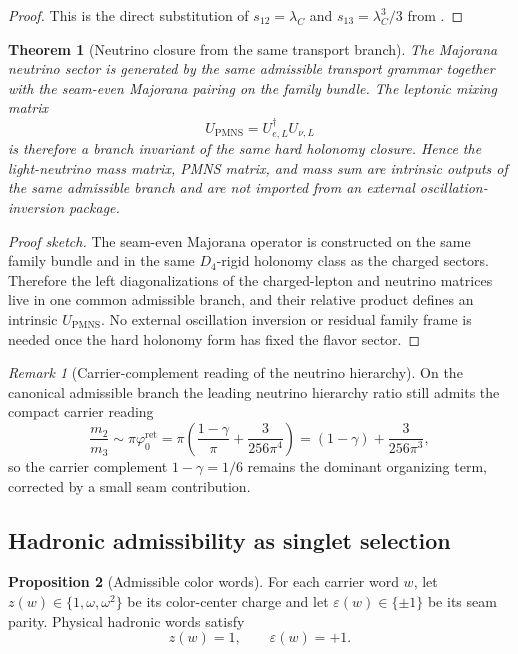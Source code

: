 \documentclass[11pt,a4paper]{article}
\newtheorem{theorem}{Theorem}[section]
\theoremstyle{definition}
\newtheorem{proposition}[theorem]{Proposition}
\theoremstyle{remark}
\newtheorem*{remark}{Remark}
\newcommand{\phiz}{\varphi_0^{\mathrm{ret}}}
\begin{document}
\begin{proof}
This is the direct substitution of $s_{12}=\lambda_C$ and
$s_{13}=\lambda_C^3/3$ from .
\end{proof}

\begin{theorem}[Neutrino closure from the same transport branch]
\label{thm:neutrino-closure}
The Majorana neutrino sector is generated by the same admissible transport grammar together
with the seam-even Majorana pairing on the family bundle. The leptonic mixing matrix
\[
U_{\mathrm{PMNS}}=U_{e,L}^\dagger U_{\nu,L}
\]
is therefore a branch invariant of the same hard holonomy closure. Hence the light-neutrino mass
matrix, PMNS matrix, and mass sum are intrinsic outputs of the same admissible branch and are not
imported from an external oscillation-inversion package.
\end{theorem}

\begin{proof}[Proof sketch]
The seam-even Majorana operator is constructed on the same family bundle and in the same
$D_4$-rigid holonomy class as the charged sectors. Therefore the left diagonalizations of the
charged-lepton and neutrino matrices live in one common admissible branch, and their relative
product defines an intrinsic $U_{\mathrm{PMNS}}$. No external oscillation inversion or residual
family frame is needed once the hard holonomy form has fixed the flavor sector.
\end{proof}

\begin{remark}[Carrier-complement reading of the neutrino hierarchy]
On the canonical admissible branch the leading neutrino hierarchy ratio still admits the
compact carrier reading
\[
\frac{m_2}{m_3}\sim \pi\phiz
=
\pi\!\left(\frac{1-\gamma}{\pi}+\frac{3}{256\pi^4}\right)
=
(1-\gamma)+\frac{3}{256\pi^3},
\]
so the carrier complement $1-\gamma=1/6$ remains the dominant organizing term, corrected by a
small seam contribution.
\end{remark}

\subsection{Hadronic admissibility as singlet selection}

\begin{proposition}[Admissible color words]
For each carrier word $w$, let $z(w)\in\{1,\omega,\omega^2\}$ be its color-center charge and let $\varepsilon(w)\in\{\pm1\}$ be its seam parity. Physical hadronic words satisfy
\[
z(w)=1,
\qquad
\varepsilon(w)=+1.
\]
\end{proposition}
\end{document}
